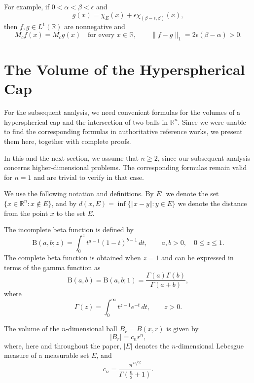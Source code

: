 \documentclass[12pt]{amsart}
\numberwithin{equation}{section}
\begin{document}
For example, if $0<\alpha<\beta<\epsilon$ and
\[
g(x)=\chi_E(x)+\epsilon\chi_{(\beta-\epsilon,\beta)}(x),
\]
then $f,g\in L^1(\mathbb{R})$ are nonnegative and
\[
M_cf(x)=M_cg(x)\quad\text{for every }x\in\mathbb{R},
\qquad \|f-g\|_1=2\epsilon(\beta-\alpha)>0.
\]

\section{The Volume of the Hyperspherical Cap}

For the subsequent analysis, we need convenient formulas for the volumes
of a hyperspherical cap and the intersection of two balls in
$\mathbb{R}^n$. Since we were unable to find the corresponding formulas in
authoritative reference works, we present them here, together with
complete proofs.

In this and the next section, we assume that $n\geq2$, since our subsequent
analysis concerns higher-dimensional problems. The corresponding formulas
remain valid for $n=1$ and are trivial to verify in that case.

We use the following notation and definitions.
By $E^c$ we denote the set $\lbrace x\in\mathbb{R}^n : x\notin E\rbrace$,
and by $d(x,E)=\inf\lbrace\Vert x-y\Vert : y\in E\rbrace$ we denote the
distance from the point $x$ to the set $E$.

The incomplete beta function is defined by
\begin{equation}
\label{incomplete_beta}
\mathrm{B}(a,b;z)=\int_0^z t^{a-1}(1-t)^{b-1}\,dt,
\qquad a,b>0,\quad 0\leq z\leq1.
\end{equation}
The complete beta function is obtained when $z=1$ and can be expressed
in terms of the gamma function as
\begin{equation}
\label{complete_beta}
\mathrm{B}(a,b)=\mathrm{B}(a,b;1)
=\frac{\Gamma(a)\Gamma(b)}{\Gamma(a+b)},
\end{equation}
where
\[
\Gamma(z)=\int_0^\infty t^{z-1}e^{-t}\,dt,\qquad z>0.
\]

The volume of the $n$-dimensional ball $B_r=B(x,r)$ is given by
\begin{equation}
\label{ball_volume}
|B_r|=c_n r^n,
\end{equation}
where, here and throughout the paper, $|E|$ denotes the $n$-dimensional
Lebesgue measure of a measurable set $E$, and
\begin{equation}
c_n=\frac{\pi^{n/2}}{\Gamma\!\left(\frac n2+1\right)}.
\end{equation}
\end{document}
